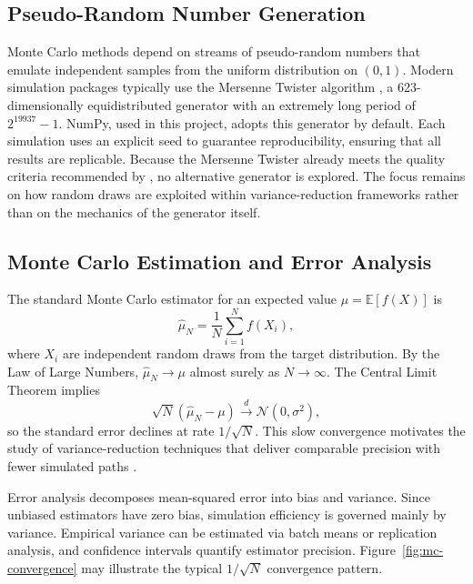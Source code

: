 \subsection{Pseudo-Random Number Generation}

Monte Carlo methods depend on streams of pseudo-random numbers that emulate independent samples from the uniform distribution on $(0,1)$. Modern simulation packages typically use the Mersenne Twister algorithm \citep{matsumoto1998}, a 623-dimensionally equidistributed generator with an extremely long period of $2^{19937}-1$. NumPy, used in this project, adopts this generator by default. Each simulation uses an explicit seed to guarantee reproducibility, ensuring that all results are replicable. Because the Mersenne Twister already meets the quality criteria recommended by \citet{lawKelton2015}, no alternative generator is explored. The focus remains on how random draws are exploited within variance-reduction frameworks rather than on the mechanics of the generator itself.

\subsection{Monte Carlo Estimation and Error Analysis}

The standard Monte Carlo estimator for an expected value $\mu = \mathbb{E}[f(X)]$ is
\begin{equation}
    \hat{\mu}_N = \frac{1}{N}\sum_{i=1}^{N} f(X_i),
\end{equation}
where $X_i$ are independent random draws from the target distribution. By the Law of Large Numbers, $\hat{\mu}_N \rightarrow \mu$ almost surely as $N \rightarrow \infty$. The Central Limit Theorem implies
\begin{equation}
    \sqrt{N}(\hat{\mu}_N - \mu) \xrightarrow{d} \mathcal{N}(0, \sigma^2),
\end{equation}
so the standard error declines at rate $1/\sqrt{N}$. This slow convergence motivates the study of variance-reduction techniques that deliver comparable precision with fewer simulated paths \citep{glasserman2004, lawKelton2015}.

Error analysis decomposes mean-squared error into bias and variance. Since unbiased estimators have zero bias, simulation efficiency is governed mainly by variance. Empirical variance can be estimated via batch means or replication analysis, and confidence intervals quantify estimator precision. Figure~\ref{fig:mc-convergence} may illustrate the typical $1/\sqrt{N}$ convergence pattern.

